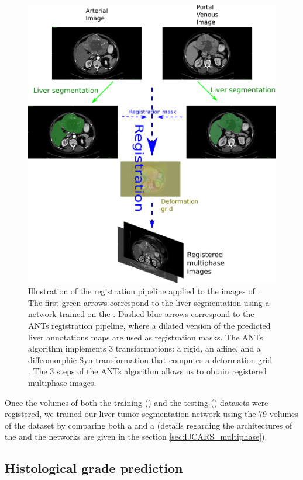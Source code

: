 \begin{figure}[th!]
\centering
\includegraphics[width=0.7\linewidth]{../HistologicalGradePrediction/images/ResizeRegistrationTCIA_pipeline_vertical3}
\caption{Illustration of the registration pipeline applied to the images of \textbf{}. The first green arrows correspond to the liver segmentation using a network trained on the \textbf{}. Dashed blue arrows correspond to the ANTs registration pipeline, where a dilated version of the predicted liver annotations maps are used as registration masks. The ANTs algorithm implements 3 transformations: a rigid, an affine, and a diffeomorphic Syn transformation that computes a deformation grid \cite{Avants2008}. The 3 steps of the ANTs algorithm allows us to obtain registered multiphase images.}
\label{fig:RegistrationTCIA_pipeline_vertical2}
\end{figure}

Once the volumes of both the training (\textbf{}) and the testing (\textbf{}) datasets were registered, we trained our liver tumor segmentation network using the 79 volumes of the \textbf{} dataset by comparing both a  and a  (details regarding the architectures of the  and the  networks are given in the section \ref{sec:IJCARS_multiphase}).


\subsection{Histological grade prediction}\label{subsect_hist_grad_pred}

